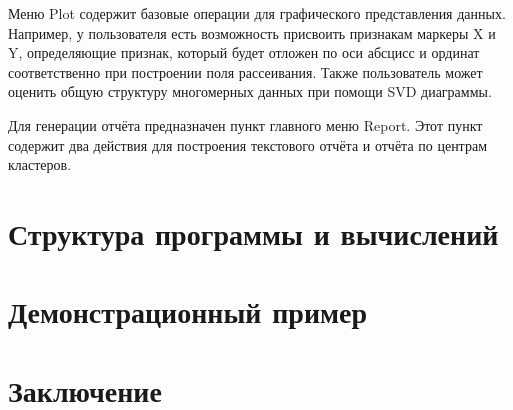 \documentclass[12pt]{diploma}
\begin{document}
	Меню Plot содержит базовые операции для графического представления данных. Например, у пользователя есть возможность присвоить признакам маркеры X и Y, определяющие признак, который будет отложен по оси абсцисс и ординат соответственно при построении поля рассеивания. Также пользователь может оценить общую структуру многомерных данных при помощи SVD диаграммы. 
	
	Для генерации отчёта предназначен пункт главного меню Report. Этот пункт содержит два действия для построения текстового отчёта и отчёта по центрам кластеров.
	
	
	
	\section{Структура программы и вычислений}
	\section{Демонстрационный пример}
	\section{Заключение}
	
	
	
	
	
	\newpage
	
	
	
\end{document}
